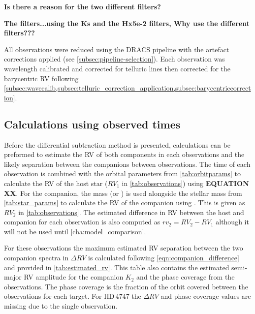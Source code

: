 \textbf{Is there a reason for the two different filters?}



\textbf{The filters...using the {Ks} and the {Hx5e-2} filters, Why use the different filters???}

All observations were reduced using the {DRACS} pipeline with the artefact corrections applied (see \cref{subsec:pipeline-selection}).
Each observation was wavelength calibrated and corrected for telluric lines then corrected for the barycentric RV following  \cref{subsec:wavecalib,subsec:telluric_correction_application,subsec:barycentriccorrection}.


\subsection{Calculations using observed times}
{\red{}
Before the differential subtraction method is presented, calculations can be preformed to estimate the RV of both components in each observations and the likely separation between the companions between observations.
The time of each observation is combined with the orbital parameters from \cref{tab:orbitparams} to calculate the RV of the host star (\({RV}_{1}\) in \cref{tab:observations}) using \textbf{EQUATION XX}.
For the companion, the mass (\Mtwo or \Mtwosini{}) is used alongside the stellar mass from \cref{tab:star_params} to calculate the RV of the companion using .
This is given as \({RV}_{2}\) in \cref{tab:observations}.
The estimated difference in RV between the host and companion for each observation is also computed as \({rv}_{2} = {RV}_{2}-{RV}_{1}\) although it will not be used until \cref{cha:model_comparison}.

For these observations the maximum estimated RV separation between the two companion spectra in  \(\Delta RV\) is calculated following \cref{eqn:companion_difference} and provided in \cref{tab:estimated_rv}.
This table also contains the estimated semi-major RV amplitude for the companion \(K_2\) and the phase coverage from the observations.
The phase coverage is the fraction of the orbit covered between the observations for each target.
For {HD\,4747} the \(\Delta RV\) and phase coverage values are missing due to the single observation.
}




